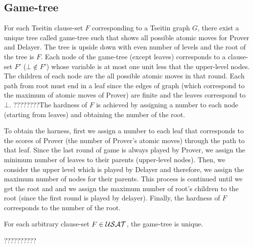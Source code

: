 \documentclass{report}
\begin{document}
\subsection{Game-tree}
\label{sec:Game-tree}

For each Tseitin clause-set $F$ corresponding to a Tseitin graph $G$, there exist a unique tree called game-tree such that shows all possible atomic moves for Prover and Delayer. The tree is upside down with even number of levels and the root of the tree is $F$. Each node of the game-tree (except leaves) corresponds to a clause-set $F'$ ($ \bot \not \in F'$) whose variable is at most one unit less that the upper-level nodes. The children of each node are the all possible atomic moves in that round. Each path from root must end in a leaf since the edges of graph (which correspond to the maximum of atomic moves of Prover) are finite and the leaves correspond to $\bot$. ????????The hardness of $F$ is achieved by assigning a number to each node (starting from leaves) and obtaining the number of the root.

To obtain the harness, first we assign a number to each leaf that corresponds to the scores of Prover (the number of Prover's atomic moves) through the path to that leaf. Since the last round of game is always played by Prover, we assign the minimum number of leaves to their parents (upper-level nodes). Then, we consider the upper level which is played by Delayer and therefore, we assign the maximum number of nodes for their parents. This process is continued until we get the root and and we assign the maximum number of root's children to the root (since the first round is played by delayer). Finally, the hardness of $F$ corresponds to the number of the root.

\begin{lem}\label{lem:game2}
For each arbitrary clause-set $F \in \mathcal{USAT}$, the game-tree is unique.
\end{lem}
\begin{prf}
??????????
\end{prf}
\end{document}
